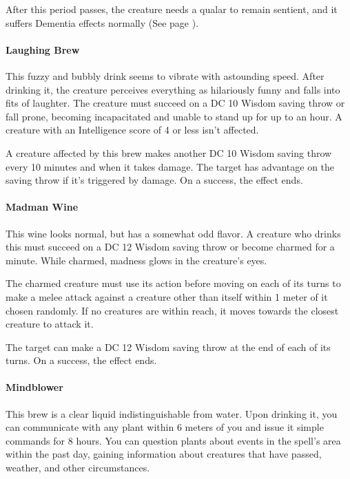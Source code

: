         After this period passes, the creature needs a qualar to remain sentient, and it suffers Dementia effects normally (See page \pageref{ssec::dementia}).
    \paragraph{Laughing Brew} %
        This fuzzy and bubbly drink seems to vibrate with astounding speed.
        After drinking it, the creature perceives everything as hilariously funny and falls into fits of laughter.
        The creature must succeed on a DC 10 Wisdom saving throw or fall prone, becoming incapacitated and unable to stand up for up to an hour.
        A creature with an Intelligence score of 4 or less isn't affected.

        A creature affected by this brew makes another DC 10 Wisdom saving throw every 10 minutes and when it takes damage.
        The target has advantage on the saving throw if it's triggered by damage.
        On a success, the effect ends.
    \paragraph{Madman Wine} %
        This wine looks normal, but has a somewhat odd flavor.
        A creature who drinks this must succeed on a DC 12 Wisdom saving throw or become charmed for a minute.
        While charmed, madness glows in the creature's eyes.

        The charmed creature must use its action before moving on each of its turns to make a melee attack against a creature other than itself within 1 meter of it chosen randomly.
        If no creatures are within reach, it moves towards the closest creature to attack it.

        The target can make a DC 12 Wisdom saving throw at the end of each of its turns.
        On a success, the effect ends.
    \paragraph{Mindblower} %
        This brew is a clear liquid indistinguishable from water.
        Upon drinking it, you can communicate with any plant within 6 meters of you and issue it simple commands for 8 hours.
        You can question plants about events in the spell's area within the past day, gaining information about creatures that have passed, weather, and other circumstances.

